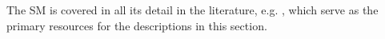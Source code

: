 The SM is covered in all its detail in the literature, e.g. , which serve as the primary resources for the descriptions in this section.








